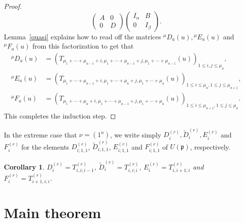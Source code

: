 \documentclass[twoside,12pt,reqno]{amsart}
\newtheorem{Corollary}[Proposition]{Corollary}
\begin{document}
\begin{proof}
$$\left(\begin{array}{ll}A&0\\0&D\end{array}\right)
\left(\begin{array}{ll}I_\alpha&B\\0&I_\beta\end{array}\right).
$$
Lemma~\ref{quasi} explains how to 
read off the matrices
${^\mu}D_a(u), {^\mu}E_a(u)$ and ${^\mu}F_a(u)$
from this factorization
to get that 
\begin{align*}
{^\mu}D_{a}(u) &= \left(T_{\mu_1+\cdots+\mu_{a-1}+i,\mu_1+\cdots+\mu_{a-1}+j,
\mu_1+\cdots+\mu_{a-1}}(u)\right)_{1 \leq i,j \leq \mu_a},\\
{^\mu}E_{a}(u) &= \left(T_{\mu_1+\cdots+\mu_{a-1}+i,\mu_1+\cdots+\mu_{a}+j,
\mu_1+\cdots+\mu_{a}}(u)\right)_{1 \leq i \leq \mu_a, 1 \leq j \leq \mu_{a+1}},\\
{^\mu}F_{a}(u) &= \left(T_{\mu_1+\cdots+\mu_{a}+i,\mu_1+\cdots+\mu_{a-1}+j,
\mu_1+\cdots+\mu_{a}}(u)\right)_{1 \leq i \leq \mu_{a+1}, 1 \leq j \leq \mu_{a}}.
\end{align*}
This completes the induction step.
\end{proof}

In the extreme case that $\nu = (1^n)$, we
write simply $D_i^{(r)},
\widetilde{D}_i^{(r)},E_i^{(r)}$ and
$F_i^{(r)}$ for the elements $D_{i;1,1}^{(r)}$,
$\widetilde{D}_{i;1,1}^{(r)}$,
$E_{i;1,1}^{(r)}$ and $F_{i;1,1}^{(r)}$
of $U(\mathfrak{p})$, respectively.

\begin{Corollary}\label{transcor}
$D_i^{(r)} = T_{i,i;i-1}^{(r)}$,
$\widetilde{D}_i^{(r)} = T_{i,i;i}^{(r)}$,
$E_i^{(r)} = T_{i,i+1;i}^{(r)}$ and
$F_i^{(r)} = T_{i+1,i;i}^{(r)}$.
\end{Corollary}

\section{Main theorem}\label{smain}
\end{document}
